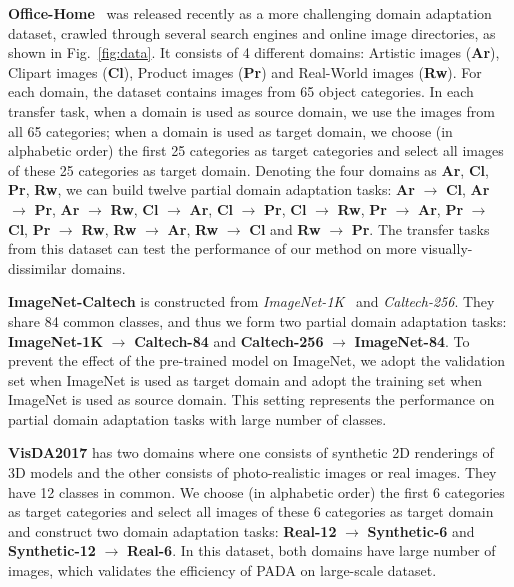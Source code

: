 \documentclass[runningheads]{llncs}
\begin{document}
\textbf{Office-Home}~\cite{cite:CVPR17OfficeHome} was released recently as a more challenging domain adaptation dataset, crawled through several search engines and online image directories, as shown in Fig.~\ref{fig:data}. It consists of 4 different domains: Artistic images (\textbf{Ar}), Clipart images (\textbf{Cl}), Product images (\textbf{Pr}) and Real-World images (\textbf{Rw}). For each domain, the dataset contains images from 65 object categories. In each transfer task, when a domain is used as source domain, we use the images from all 65 categories; when a domain is used as target domain, we choose (in alphabetic order) the first 25 categories as target categories and select all images of these 25 categories as target domain. Denoting the four domains as \textbf{Ar}, \textbf{Cl}, \textbf{Pr}, \textbf{Rw}, we can build twelve partial domain adaptation tasks: \textbf{Ar} $\rightarrow$ \textbf{Cl}, \textbf{Ar} $\rightarrow$ \textbf{Pr}, \textbf{Ar} $\rightarrow$ \textbf{Rw}, \textbf{Cl} $\rightarrow$ \textbf{Ar}, \textbf{Cl} $\rightarrow$ \textbf{Pr}, \textbf{Cl} $\rightarrow$ \textbf{Rw}, \textbf{Pr} $\rightarrow$ \textbf{Ar}, \textbf{Pr} $\rightarrow$ \textbf{Cl}, \textbf{Pr} $\rightarrow$ \textbf{Rw}, \textbf{Rw} $\rightarrow$ \textbf{Ar}, \textbf{Rw} $\rightarrow$ \textbf{Cl} and \textbf{Rw} $\rightarrow$ \textbf{Pr}. The transfer tasks from this dataset can test the performance of our method on more visually-dissimilar domains. 

\textbf{ImageNet-Caltech} is constructed from \textit{ImageNet-1K}~\cite{cite:ILSVRC15} and \textit{Caltech-256}. They share 84 common classes, and thus we form two partial domain adaptation tasks: \textbf{ImageNet-1K} $\rightarrow$ \textbf{Caltech-84} and \textbf{Caltech-256} $\rightarrow$ \textbf{ImageNet-84}. To prevent the effect of the pre-trained model on ImageNet, we adopt the validation set when ImageNet is used as target domain and adopt the training set when ImageNet is used as source domain. This setting represents the performance on partial domain adaptation tasks with large number of classes.

\textbf{VisDA2017} has two domains where one consists of synthetic 2D renderings of 3D models and the other consists of photo-realistic images or real images. They have 12 classes in common. We choose (in alphabetic order) the first 6 categories as target categories and select all images of these 6 categories as target domain and construct two domain adaptation tasks: \textbf{Real-12} $\rightarrow$ \textbf{Synthetic-6} and \textbf{Synthetic-12} $\rightarrow$ \textbf{Real-6}. In this dataset, both domains have large number of images, which validates the efficiency of PADA on large-scale dataset.
\end{document}
